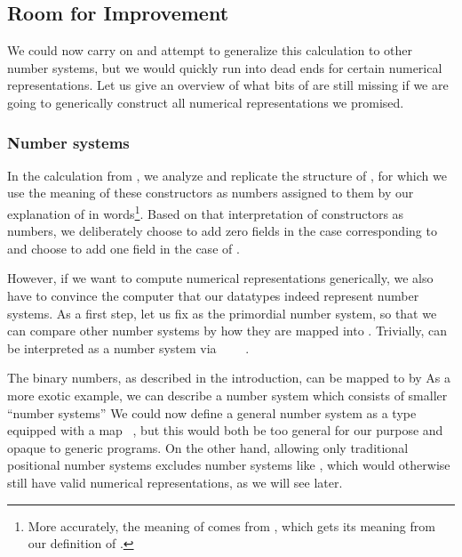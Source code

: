 \subsection{Room for Improvement}
We could now carry on and attempt to generalize this calculation to other number systems, but we would quickly run into dead ends for certain numerical representations. Let us give an overview of what bits of  are still missing if we are going to generically construct all numerical representations we promised.


\subsubsection{Number systems}\label{ssec:numbers}
In the calculation  from \bN{}, we analyze and replicate the structure of \bN{}, for which we use the meaning of these constructors as numbers assigned to them by our explanation of \bN{} in words\footnote{More accurately, the meaning of \bN{} comes from , which gets its meaning from our definition of \AF{\_<\_}.}. Based on that interpretation of constructors as numbers, we deliberately choose to add zero fields in the case corresponding to  and choose to add one field in the case of .

However, if we want to compute numerical representations generically, we also have to convince the computer that our datatypes indeed represent number systems. As a first step, let us fix \bN{} as the primordial number system, so that we can compare other number systems by how they are mapped into \bN{}. Trivially, \bN{} can be interpreted as a number system via \ \AV{:}\ \bN{}\ \ \bN{}.

The binary numbers, as described in the introduction, can be mapped to \bN{} by
As a more exotic example, we can describe a number system
which consists of smaller ``number systems''
We could now define a general number system as a type  equipped with a map \ \bN{}, but this would both be too general for our purpose and opaque to generic programs. On the other hand, allowing only traditional positional number systems excludes number systems like , which would otherwise still have valid numerical representations, as we will see later.

